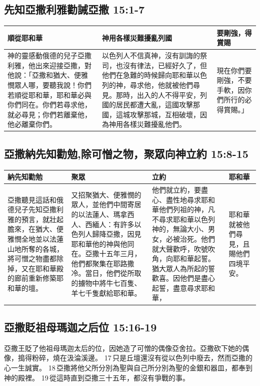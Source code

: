 \subsection{先知亞撒利雅勸誡亞撒 15:1-7}
\begin{table}[H]
\centering 
\begin{tabular}{p{6.5cm}|p{8.5cm}|p{}}\hline\hline
順從耶和華&神用各樣災難擾亂列國&要剛強，得賞賜\\\hline\hline
神的靈感動俄德的兒子亞撒利雅，他出來迎接亞撒，對他說：「亞撒和猶大、便雅憫眾人哪，要聽我說！你們若順從耶和華，耶和華必與你們同在。你們若尋求他，就必尋見；你們若離棄他，他必離棄你們。
&以色列人不信真神，沒有訓誨的祭司，也沒有律法，已經好久了，但他們在急難的時候歸向耶和華以色列的神，尋求他，他就被他們尋見。那時，出入的人不得平安，列國的居民都遭大亂，這國攻擊那國，這城攻擊那城，互相破壞，因為神用各樣災難擾亂他們。
&現在你們要剛強，不要手軟，因你們所行的必得賞賜。」\\\hline
\end{tabular}
\end{table}


\subsection{亞撒納先知勸勉,除可憎之物，聚眾向神立約 15:8-15}
\begin{table}[H]
\centering 
\begin{tabular}{p{}|p{5.5cm}|p{5.5cm}|p{1.25cm}}\hline\hline
納先知勸勉&聚眾&立約&耶和華\\\hline\hline
亞撒聽見這話和俄德兒子先知亞撒利雅的預言，就壯起膽來，在猶大、便雅憫全地並以法蓮山地所奪的各城，將可憎之物盡都除掉，又在耶和華殿的廊前重新修築耶和華的壇。
&又招聚猶大、便雅憫的眾人，並他們中間寄居的以法蓮人、瑪拿西人、西緬人：有許多以色列人歸降亞撒，因見耶和華他的神與他同在。亞撒十五年三月，他們都聚集在耶路撒冷。當日，他們從所取的擄物中將牛七百隻、羊七千隻獻給耶和華。
&他們就立約，要盡心、盡性地尋求耶和華他們列祖的神，凡不尋求耶和華以色列神的，無論大小、男女，必被治死。他們就大聲歡呼，吹號吹角，向耶和華起誓。猶大眾人為所起的誓歡喜。因他們是盡心起誓，盡意尋求耶和華，
&耶和華就被他們尋見，且賜他們四境平安。\\\hline
\end{tabular}
\end{table}


\subsection{亞撒貶祖母瑪迦之后位 15:16-19}
亞撒王貶了他祖母瑪迦太后的位，因她造了可憎的偶像亞舍拉。亞撒砍下她的偶像，搗得粉碎，燒在汲淪溪邊。 17 只是丘壇還沒有從以色列中廢去，然而亞撒的心一生誠實。 18 亞撒將他父所分別為聖與自己所分別為聖的金銀和器皿，都奉到神的殿裡。 19 從這時直到亞撒三十五年，都沒有爭戰的事。

